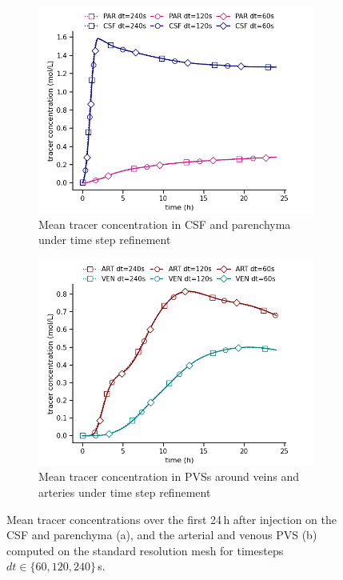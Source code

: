 \documentclass[fleqn,10pt]{wlscirep}
\begin{document}
\begin{figure}
    \centering
    \begin{subfigure}[b]{0.45\textwidth}
        \centering
        \includegraphics[width = 1 \linewidth]{figures/time_refinement_par_csf_mean.png}
        \caption{Mean tracer concentration in CSF and parenchyma under time step refinement}
    \end{subfigure}
    \begin{subfigure}[b]{0.45\textwidth}
        \centering
     \includegraphics[width= 1\linewidth]{figures/time_refinement_art_ven_mean.png}
         \caption{Mean tracer concentration in PVSs around veins and arteries under time step refinement}
    \end{subfigure}
    \caption{Mean tracer concentrations over the first 24\,h after injection on the CSF and parenchyma (a), and the arterial and venous PVS (b) computed on the standard resolution mesh for timesteps $dt \in \{60, 120, 240 \}$\,s.}    \label{fig:time_convergence_concentrations}
\end{figure}
\end{document}
